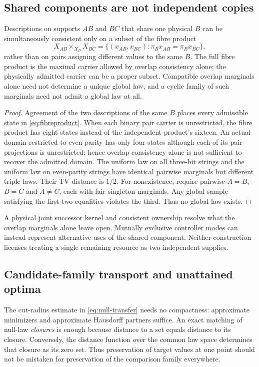 \subsection{Shared components are not independent copies}
\begin{proposition}\label{p2-25}
Descriptions on supports \(AB\) and \(BC\) that share one physical \(B\) can be simultaneously consistent only on a subset of the fibre product
\begin{equation}\label{eq:fibreproduct}
 X_{AB}\times_{X_B}X_{BC}
 =\{(x_{AB},x_{BC}):\pi_Bx_{AB}=\pi_Bx_{BC}\},
\end{equation}
rather than on pairs assigning different values to the same \(B\). The full fibre product is the maximal carrier allowed by overlap consistency alone; the physically admitted carrier can be a proper subset. Compatible overlap marginals alone need not determine a unique global law, and a cyclic family of such marginals need not admit a global law at all.
\end{proposition}
\begin{proof}
Agreement of the two descriptions of the same \(B\) places every admissible state in \cref{eq:fibreproduct}. When each binary pair carrier is unrestricted, the fibre product has eight states instead of the independent product's sixteen. An actual domain restricted to even parity has only four states although each of its pair projections is unrestricted; hence overlap consistency alone is not sufficient to recover the admitted domain. The uniform law on all three-bit strings and the uniform law on even-parity strings have identical pairwise marginals but different triple laws. Their TV distance is \(1/2\). For nonexistence, require pairwise \(A=B\), \(B=C\) and \(A\ne C\), each with fair singleton marginals. Any global sample satisfying the first two equalities violates the third. Thus no global law exists.
\end{proof}
A physical joint successor kernel and consistent ownership resolve what the overlap marginals alone leave open. Mutually exclusive controller modes can instead represent alternative uses of the shared component. Neither construction licenses treating a single remaining resource as two independent supplies.

\subsection{Candidate-family transport and unattained optima}
The cut-radius estimate in \cref{eq:null-transfer} needs no compactness: approximate minimizers and approximate Hausdorff partners suffice. An exact matching of null-law \emph{closures} is enough because distance to a set equals distance to its closure. Conversely, the distance function over the common law space determines that closure as its zero set. Thus preservation of target values at one point should not be mistaken for preservation of the comparison family everywhere.

